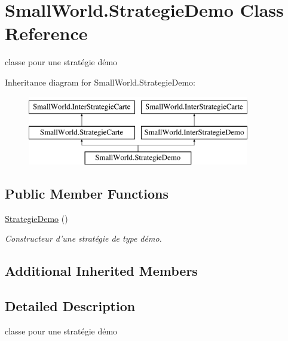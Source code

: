 \hypertarget{class_small_world_1_1_strategie_demo}{\section{Small\-World.\-Strategie\-Demo Class Reference}
\label{class_small_world_1_1_strategie_demo}
}


classe pour une stratégie démo  


Inheritance diagram for Small\-World.\-Strategie\-Demo\-:\begin{figure}[H]
\begin{center}
\leavevmode
\includegraphics[height=3.000000cm]{class_small_world_1_1_strategie_demo}
\end{center}
\end{figure}
\subsection*{Public Member Functions}
\begin{DoxyCompactItemize}
\item 
\hyperlink{class_small_world_1_1_strategie_demo_ac0e57687e10baea750275c611e430094}{Strategie\-Demo} ()
\begin{DoxyCompactList}\small\item\em Constructeur d'une stratégie de type démo. \end{DoxyCompactList}\end{DoxyCompactItemize}
\subsection*{Additional Inherited Members}


\subsection{Detailed Description}
classe pour une stratégie démo 

